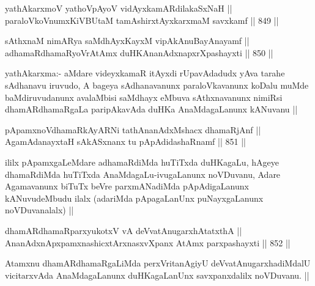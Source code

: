 \begin{shl}
yathAkarxmoV yathoVpAyoV vidAyxkamARdilakaSxNaH || \\
paraloVkoVnumxKiVBUtaM tamAshirxtAyx\s \s karxmaM savxkamf ||  849 ||  
\end{shl}
				
\begin{shl}
sAthxnaM nimARya saMdhAyxKayxM vipAkAnuBayAnayamf || \\
adhamaRdhamaRyoVrAtAmx duHKAnanAdxnapxrXpashayxti ||  850 ||  
\end{shl}

\begin{artha}
yathAkarxma:- aMdare videyxkamaR itAyxdi rUpavAdadudx yAva tarahe sAdhanavu iruvudo, A bageya sAdhanavanunx paraloVkavanunx koDalu muMde baMdiruvudanunx avalaMbisi saMdhayx eMbuva sAthxnavanunx nimiRsi dhamARdhamaRgaLa paripAkavAda duHKa AnaMdagaLanunx kANuvanu ||
\end{artha}


\begin{shl}
pApamxnoV\s dhamaRkAyARNi tathA\s \s nanAdxMshacx dhamaRjAnf || \\
AgamAdanayxtaH sAkASxnanx tu pApAdidashaRnamf ||  851 ||  
\end{shl}

\begin{artha}
ililx pApamxgaLeMdare adhamaRdiMda huTiTxda duHKagaLu, hAgeye dhamaRdiMda huTiTxda AnaMdagaLu-ivugaLanunx noVDuvanu, Adare Agamavanunx biTuTx beVre parxmANadiMda pApAdigaLanunx kANuvudeMbudu ilalx (adariMda pApagaLanUnx puNayxgaLanunx noVDuvanalalx) ||
\end{artha}


\begin{shl}
dhamARdhamaRparxyukotxV vA deVvatAnugarxhAtatxthA || \\
AnanAdxnApxpamxnashicxtArxnasxvXpanx AtAmx parxpashayxti ||  852 ||  
\end{shl}

\begin{artha}
Atamxnu dhamARdhamaRgaLiMda perxVritanAgiyU deVvatAnugarxhadiMdalU vicitarxvAda AnaMdagaLanunx duHKagaLanUnx savxpanxdalilx noVDuvanu. ||
\end{artha}


